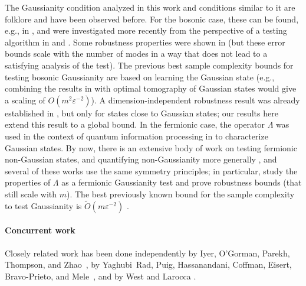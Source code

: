 \documentclass[11pt,a4paper]{article}
\numberwithin{equation}{section}
\newcommand{\eps}{\varepsilon}
\newcommand{\1}{\mathbf{1}}
\begin{document}
The Gaussianity condition analyzed in this work and conditions similar to it are folklore and have been observed before.
For the bosonic case, these can be found, e.g., in \cite{mann1991bifactorizable,springer2009conditions}, and were investigated more recently from the perspective of a testing algorithm in \cite{bu2025efficient} and \cite{girardi2025gaussian}. Some robustness properties were shown in \cite{cuesta2020stable} (but these error bounds scale with the number of modes in a way that does not lead to a satisfying analysis of the test).
The previous best sample complexity bounds for testing bosonic Gaussianity are based on learning the Gaussian state (e.g., combining the results in \cite{girardi2025gaussian} with optimal tomography of Gaussian states \cite{chen2026optimal} would give a scaling of $O(m^2 \eps^{-2})$). A dimension-independent robustness result was already established in \cite{girardi2025gaussian}, but only for states close to Gaussian states; our results here extend this result to a global bound.
In the fermionic case, the operator $\Lambda$ was used in the context of quantum information processing in \cite{bravyi2005lagrangian,melo2013power} to characterize Gaussian states.
By now, there is an extensive body of work on testing fermionic non-Gaussian states, and quantifying non-Gaussianity more generally
\cite{lyu2024fermionic,bittel2025optimal,coffman2025measuring,leone2026fermionic,tarabunga2026fermionic,haug2026practical,sierant2026fermionic,tarabunga2026computable}, and several of these works use the same symmetry principles; in particular, \cite{haug2026practical,tarabunga2026fermionic} study the properties of $\Lambda$ as a fermionic Gaussianity test and prove robustness bounds (that still scale with $m$).
The best previously known bound for the sample complexity to test Gaussianity is $\tilde O(m \eps^{-2})$ \cite{leone2026fermionic}.

\paragraph{Concurrent work}
Closely related work has been done independently by Iyer, O'Gorman, Parekh, Thompson, and Zhao~\cite{iyer2026optimal}, by Yaghubi~Rad, Puig, Hassanandani, Coffman, Eisert, Bravo-Prieto, and Mele~\cite{rad2026testing}, and by West and Larocca \cite{west2026fermionic}.


\end{document}
